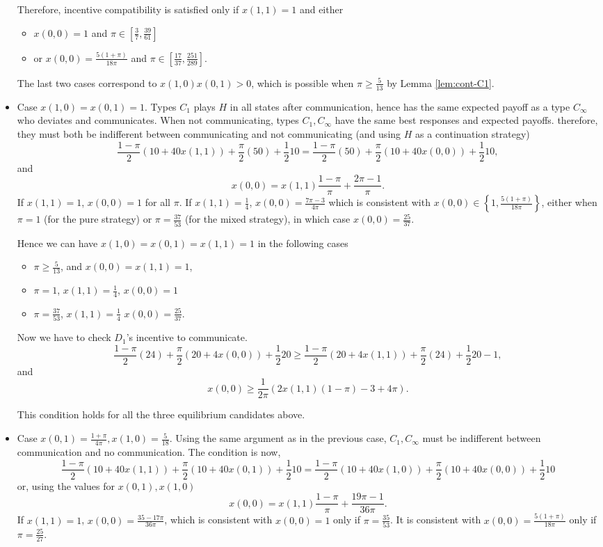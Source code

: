 \documentclass[12pt]{article}
\theoremstyle{definition}
\theoremstyle{remark}
\begin{document}
\begin{itemize}
    Therefore, incentive compatibility is satisfied only if $x(1,1)=1$ and  either
    \begin{itemize}
        \item $x(0,0)=1$ and $\pi\in\left[ \frac{3}{7},\frac{39}{61} \right]$
        \item or $x(0,0)=\frac{5(1+\pi)}{18\pi}$ and $\pi\in \left[ \frac{17}{37}, \frac{251}{289} \right]$.
    \end{itemize}
    The last two cases correspond to $x(1,0)x(0,1)>0$, which is possible when $\pi\geq \frac{5}{13}$ by Lemma \ref{lem:cont-C1}.
    
    \item Case $x(1,0)=x(0,1)=1$. Types $C_1$ plays $H$ in all states after communication, hence has the same expected payoff as a type $C_\infty$ who deviates and communicates. When not communicating, types $C_1,C_\infty$ have the same best responses and expected payoffs. therefore, they must both be indifferent between communicating and not communicating (and using $H$ as a continuation strategy) 
    \[
\frac{1-\pi}{2}(10+40x(1,1))+\frac{\pi}{2}(50)+\frac{1}{2}10=\frac{1-\pi}{2}(50)+\frac{\pi}{2}(10+40x(0,0))+\frac{1}{2}10,
\]
and 
\[
x(0,0)=x(1,1)\frac{1-\pi}{\pi}+\frac{2\pi-1}{\pi}.
\]
If $x(1,1)=1$, $x(0,0)=1$ for all $\pi$. If $x(1,1)=\frac{1}{4}$, $x(0,0)=\frac{7\pi-3}{4\pi}$ which is consistent with $x(0,0)\in\left\{1,\frac{5(1+\pi)}{18\pi}\right\}$, either when $\pi=1$ (for the pure strategy) or $\pi=\frac{37}{53}$ (for the mixed strategy), in which case $x(0,0)=\frac{25}{37}$.

 Hence we can have $x(1,0)=x(0,1)=x(1,1)=1$ in the following cases
\begin{itemize}
    \item $\pi\geq \frac{5}{13}$, and $x(0,0)=x(1,1)=1$,
    \item $\pi=1$, $x(1,1)=\frac{1}{4}$, $x(0,0)=1$
    \item $\pi=\frac{37}{53}$, $x(1,1)=\frac{1}{4}$ $x(0,0)=\frac{25}{37}$.
\end{itemize}

Now we have to check $D_1$'s incentive to communicate. 
    \[
\frac{1-\pi}{2}(24)+\frac{\pi}{2}(20+4x(0,0))+\frac{1}{2}20\geq\frac{1-\pi}{2}(20+4x(1,1))+\frac{\pi}{2}(24)+\frac{1}{2}20-1,
\]
and 
\[
x(0,0)\geq \frac{1}{2\pi} (2x(1,1)(1-\pi) - 3 + 4\pi).
\]

This condition holds for all the three equilibrium candidates above.

\item Case $x(0,1)=\frac{1+\pi}{4\pi},x(1,0)=\frac{5}{18}$. Using the same argument as in the previous case, $C_1,C_\infty$ must be indifferent between communication and no communication. The condition is now,
\[
\frac{1-\pi}{2}(10+40x(1,1))+\frac{\pi}{2}(10+40 x(0,1))+\frac{1}{2}10=\frac{1-\pi}{2}(10+40x(1,0))+\frac{\pi}{2}(10+40x(0,0))+\frac{1}{2}10
\]
or, using the values for $x(0,1),x(1,0)$
\[
x(0,0)=x(1,1)\frac{1-\pi}{\pi}+\frac{19\pi -1}{36 \pi}.
\]
If $x(1,1)=1$, $x(0,0)=\frac{35-17\pi}{36\pi}$, which is consistent with $x(0,0)=1$ only if $\pi=\frac{35}{53}$. It is  consistent with $x(0,0)=\frac{5(1+\pi)}{18\pi}$ only if $\pi=\frac{25}{27}$.


\end{itemize}
\end{document}
